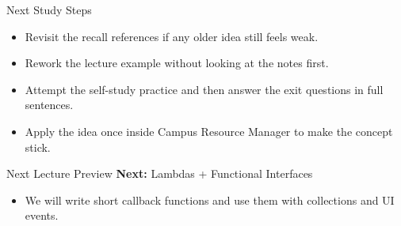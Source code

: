 \documentclass{beamer}
\begin{document}
\begin{frame}{Next Study Steps}
\begin{itemize}[<+->]
  \item Revisit the recall references if any older idea still feels weak.
  \item Rework the lecture example without looking at the notes first.
  \item Attempt the self-study practice and then answer the exit questions in full sentences.
  \item Apply the idea once inside Campus Resource Manager to make the concept stick.
\end{itemize}
  \slidesources{\OOPSUnitIVSources}
\end{frame}

\begin{frame}{Next Lecture Preview}
  \textbf{Next:} Lambdas + Functional Interfaces
  \vspace{0.6em}
  \begin{itemize}[<+->]
    \item We will write short callback functions and use them with collections and UI events.
  \end{itemize}
  \slidesources{\OOPSUnitIVSources}
\end{frame}
\end{document}
